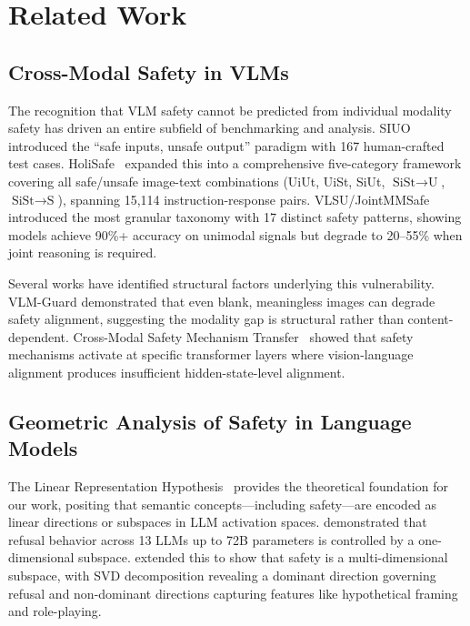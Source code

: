 \documentclass{article}
\begin{document}
\section{Related Work}
\label{sec:related}

\subsection{Cross-Modal Safety in VLMs}

The recognition that VLM safety cannot be predicted from individual modality
safety has driven an entire subfield of benchmarking and analysis.
SIUO~\citep{wang2024siuo} introduced the ``safe inputs, unsafe output'' paradigm
with 167 human-crafted test cases.  HoliSafe~\citep{lee2025holisafe} expanded
this into a comprehensive five-category framework covering all safe/unsafe
image-text combinations (UiUt, UiSt, SiUt, $\text{SiSt}{\to}\text{U}$,
$\text{SiSt}{\to}\text{S}$), spanning 15,114 instruction-response pairs.
VLSU/JointMMSafe~\citep{palaskar2025vlsu} introduced the most granular taxonomy
with 17 distinct safety patterns, showing models achieve 90\%+ accuracy on
unimodal signals but degrade to 20--55\% when joint reasoning is required.

Several works have identified structural factors underlying this vulnerability.
VLM-Guard demonstrated that even blank, meaningless images can degrade safety
alignment, suggesting the modality gap is structural rather than content-dependent.
Cross-Modal Safety Mechanism Transfer~\citep{xu2025cross} showed that safety
mechanisms activate at specific transformer layers where vision-language alignment
produces insufficient hidden-state-level alignment.

\subsection{Geometric Analysis of Safety in Language Models}

The Linear Representation Hypothesis~\citep{park2024linear} provides the
theoretical foundation for our work, positing that semantic concepts---including
safety---are encoded as linear directions or subspaces in LLM activation spaces.
\citet{arditi2024refusal} demonstrated that refusal behavior across 13 LLMs up
to 72B parameters is controlled by a one-dimensional subspace.
\citet{zhang2025hidden} extended this to show that safety is a multi-dimensional
subspace, with SVD decomposition revealing a dominant direction governing refusal
and non-dominant directions capturing features like hypothetical framing and
role-playing.
\end{document}
